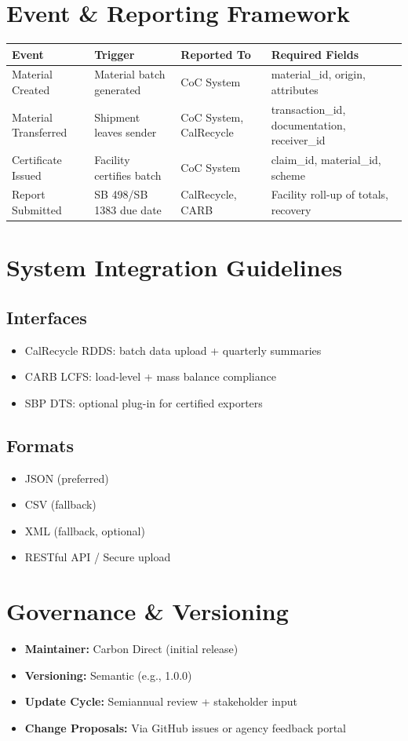\documentclass{article}
\begin{document}
\section{Event \& Reporting Framework}
\begin{longtable}{|p{4cm}|p{4cm}|p{4cm}|p{4cm}|}
\hline
\textbf{Event} & \textbf{Trigger} & \textbf{Reported To} & \textbf{Required Fields} \\
\hline
Material Created & Material batch generated & CoC System & material\_id, origin, attributes \\
Material Transferred & Shipment leaves sender & CoC System, CalRecycle & transaction\_id, documentation, receiver\_id \\
Certificate Issued & Facility certifies batch & CoC System & claim\_id, material\_id, scheme \\
Report Submitted & SB 498/SB 1383 due date & CalRecycle, CARB & Facility roll-up of totals, recovery \\
\hline
\end{longtable}

\section{System Integration Guidelines}
\subsection*{Interfaces}
\begin{itemize}[noitemsep]
    \item CalRecycle RDDS: batch data upload + quarterly summaries
    \item CARB LCFS: load-level + mass balance compliance
    \item SBP DTS: optional plug-in for certified exporters
\end{itemize}

\subsection*{Formats}
\begin{itemize}[noitemsep]
    \item JSON (preferred)
    \item CSV (fallback)
    \item XML (fallback, optional)
    \item RESTful API / Secure upload
\end{itemize}

\section{Governance \& Versioning}
\begin{itemize}[noitemsep]
    \item \textbf{Maintainer:} Carbon Direct (initial release)
    \item \textbf{Versioning:} Semantic (e.g., 1.0.0)
    \item \textbf{Update Cycle:} Semiannual review + stakeholder input
    \item \textbf{Change Proposals:} Via GitHub issues or agency feedback portal
\end{itemize}
\end{document}
